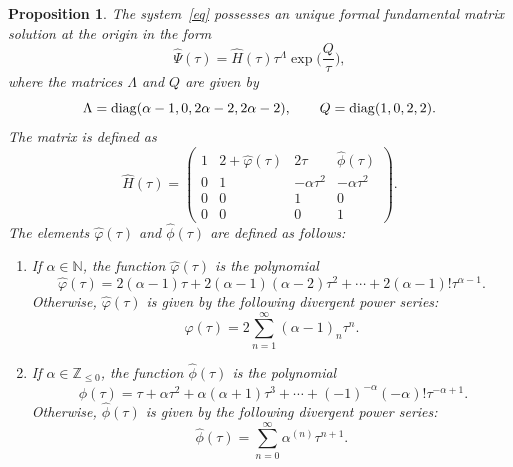 \documentclass[10pt,a4paper]{amsart}
\numberwithin{equation}{section}
\newtheorem{Proposition}[Theorem]{Proposition}
 { \theoremstyle{definition}
\newtheorem{Definition}[Theorem]{Definition}
\newtheorem{Note}[Theorem]{Note}
\newtheorem{Example}[Theorem]{Example}
\newtheorem{Remark}[Theorem]{Remark} }
\begin{document}
 \begin{Proposition}\label{for}
 The system~\eqref{eq} possesses an unique formal fundamental matrix solution at the origin in the form
 \[
 \hat{\Psi}(\tau)=\hat{H}(\tau) \tau^{\Lambda} \exp\biggl(\frac{Q}{\tau}\biggr) ,
 \]
 where the matrices $\Lambda$ and $Q$ are given by
 \begin{equation*}
 \Lambda={\rm diag} (\alpha-1, 0, 2 \alpha -2, 2 \alpha-2),\qquad
 Q={\rm diag}(1, 0, 2, 2) .%
 \end{equation*}
 The matrix  is defined as
 \[
 \hat{H}(\tau)=\begin{pmatrix}
 	 1 & 2+\hat{\varphi}(\tau) & 2 \tau & \hat{\phi}(\tau)\\
 	 0 & 1 & -\alpha \tau^2 & -\alpha \tau^2\\
 	 0 & 0 & 1 & 0\\
 	 0 & 0 & 0 & 1
 	\end{pmatrix} .
 \]
 The elements $\hat{\varphi}(\tau)$ and $\hat{\phi}(\tau)$ are defined as follows:
 \begin{enumerate}
 \itemsep=0pt 	
 \item[$1.$]
 If $\alpha\in\mathbb{N}$, the function $\hat{\varphi}(\tau)$ is the polynomial
 \begin{equation}
 \hat{\varphi}(\tau)= 2 (\alpha-1) \tau + 2 (\alpha-1) (\alpha-2) \tau^2 + \cdots + 2 (\alpha-1)! \tau^{\alpha-1} .\label{fs1}
 \end{equation}
 Otherwise, $\hat{\varphi}(\tau)$ is given by the following divergent power series:
 \[
 \hat{\varphi}(\tau)=2 \sum_{n=1}^{\infty} (\alpha-1)_n \tau^n .
 \]

 \item[$2.$]
 If $\alpha\in\mathbb{Z}_{\leq 0}$, the function $\hat{\phi}(\tau)$ is the polynomial
 \begin{equation}\
 \hat{\phi}(\tau)=\tau + \alpha \tau^2 + \alpha (\alpha+1) \tau^3 + \cdots + (-1)^{-\alpha} (-\alpha)! \tau^{-\alpha+1} .\label{fs2}
 \end{equation}
 Otherwise, $\hat{\phi}(\tau)$ is given by the following divergent power series:
 \[
 \hat{\phi}(\tau)=\sum_{n=0}^{\infty} \alpha^{(n)} \tau^{n+1} .
 \]
 \end{enumerate}
 \end{Proposition}
\end{document}
